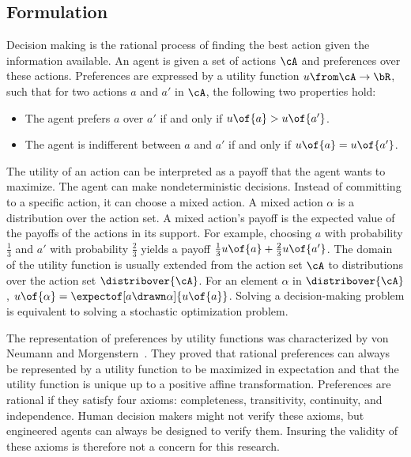 \subsection{Formulation}
Decision making is the rational process of finding the best action given the information available.
An agent is given a set of actions \(\cA\) and preferences over these actions.
Preferences are expressed by a utility function \(u \from \cA \to \bR\), such that for two actions \(a\) and \(a'\) in \(\cA\), the following two properties hold:
\begin{itemize}
\item The agent prefers \(a\) over \(a'\) if and only if \(u \of {a} > u \of {a'}\).
\item The agent is indifferent between \(a\) and \(a'\) if and only if \(u \of {a} = u \of {a'}\).
\end{itemize}
The utility of an action can be interpreted as a payoff that the agent wants to maximize.
The agent can make nondeterministic decisions.
Instead of committing to a specific action, it can choose a mixed action.
A mixed action \(\alpha\) is a distribution over the action set.
A mixed action's payoff is the expected value of the payoffs of the actions in its support.
For example, choosing \(a\) with probability \(\frac{1}{3}\) and \(a'\) with probability \(\frac{2}{3}\) yields a payoff \(\frac{1}{3} u \of {a} + \frac{2}{3} u \of {a'}\).
The domain of the utility function is usually extended from the action set \(\cA\) to distributions over the action set \(\distribover {\cA}\).
For an element \(\alpha \) in \( \distribover {\cA}\), \(u \of {\alpha} = \expectof[a \drawn \alpha]{u \of {a}}\).
Solving a decision-making problem is equivalent to solving a stochastic optimization problem.

\begin{note}
The representation of preferences by utility functions was characterized by von Neumann and Morgenstern~\cite{neumann_morgenstern:1944:2nd}.
They proved that rational preferences can always be represented by a utility function to be maximized in expectation and that the utility function is unique up to a positive affine transformation.
Preferences are rational if they satisfy four axioms: completeness, transitivity, continuity, and independence.
Human decision makers might not verify these axioms, but engineered agents can always be designed to verify them.
Insuring the validity of these axioms is therefore not a concern for this research.
\end{note}

